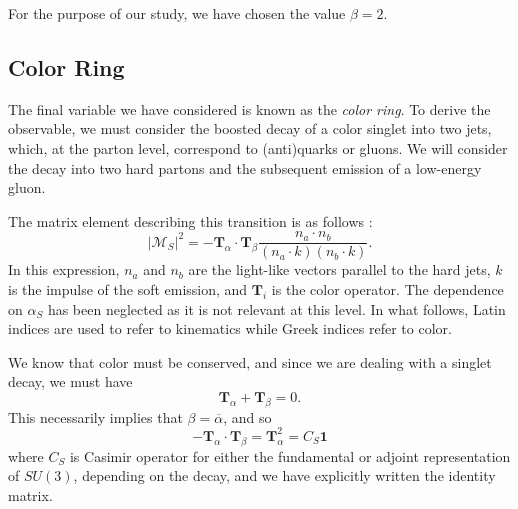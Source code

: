 \documentclass[10pt,a4paper]{book}
\begin{document}
For the purpose of our study, we have chosen the value $\beta = 2$.

\subsection{Color Ring}
The final variable we have considered is known as the \emph{color ring}. To derive the observable, we must consider the boosted decay of a color singlet into two jets, which, at the parton level, correspond to (anti)quarks or gluons. We will consider the decay into two hard partons and the subsequent emission of a low-energy gluon.

The matrix element describing this transition is as follows \cite{Buckley:2020kdp}:
\begin{equation}
\vert \mathcal{M}_S \vert^2 = -\mathbf{T}_\alpha \cdot \mathbf{T}_\beta 	\frac{n_a \cdot n_b}{(n_a \cdot k)(n_b \cdot k)}.
\end{equation}
In this expression, $n_a$ and $n_b$ are the light-like vectors parallel to the hard jets, $k$ is the impulse of the soft emission, and $\mathbf{T}_i$ is the color operator. The dependence on $\alpha_S$ has been neglected as it is not relevant at this level. In what follows, Latin indices are used to refer to kinematics while Greek indices refer to color.

We know that color must be conserved, and since we are dealing with a singlet decay, we must have
\begin{equation}
\mathbf{T}_\alpha + \mathbf{T}_\beta = 0.
\end{equation}
This necessarily implies that $\beta = \overline{\alpha}$, and so
\begin{equation}
-\mathbf{T}_\alpha \cdot \mathbf{T}_\beta = \mathbf{T}_\alpha^2 = C_S\mathbf{1}
\end{equation}
where $C_S$ is Casimir operator for either the fundamental or adjoint representation of $SU(3)$, depending on the decay, and we have explicitly written the identity matrix. 
\end{document}
